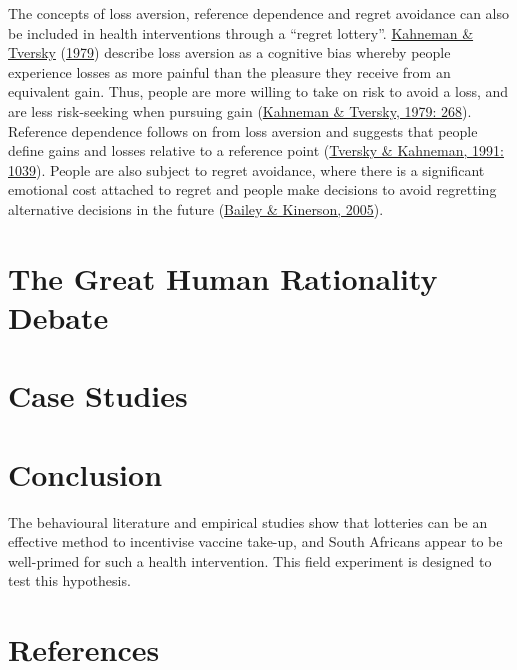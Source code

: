 \documentclass[11pt,preprint, authoryear]{elsarticle}
\numberwithin{equation}{section}
\numberwithin{figure}{section}
\numberwithin{table}{section}
\begin{document}
The concepts of loss aversion, reference dependence and regret avoidance
can also be included in health interventions through a ``regret
lottery''. \protect\hyperlink{ref-prospect}{Kahneman \& Tversky}
(\protect\hyperlink{ref-prospect}{1979}) describe loss aversion as a
cognitive bias whereby people experience losses as more painful than the
pleasure they receive from an equivalent gain. Thus, people are more
willing to take on risk to avoid a loss, and are less risk-seeking when
pursuing gain (\protect\hyperlink{ref-prospect}{Kahneman \& Tversky,
1979: 268}). Reference dependence follows on from loss aversion and
suggests that people define gains and losses relative to a reference
point (\protect\hyperlink{ref-ref}{Tversky \& Kahneman, 1991: 1039}).
People are also subject to regret avoidance, where there is a
significant emotional cost attached to regret and people make decisions
to avoid regretting alternative decisions in the future
(\protect\hyperlink{ref-regret}{Bailey \& Kinerson, 2005}).

\hypertarget{the-great-human-rationality-debate}{%
\section{\texorpdfstring{The Great Human Rationality Debate
\label{rev}}{The Great Human Rationality Debate }}\label{the-great-human-rationality-debate}}

\hypertarget{case-studies}{%
\section{\texorpdfstring{Case Studies
\label{case}}{Case Studies }}\label{case-studies}}

\hypertarget{conclusion}{%
\section{\texorpdfstring{Conclusion
\label{con}}{Conclusion }}\label{conclusion}}

The behavioural literature and empirical studies show that lotteries can
be an effective method to incentivise vaccine take-up, and South
Africans appear to be well-primed for such a health intervention. This
field experiment is designed to test this hypothesis.

\newpage

\hypertarget{references}{%
\section*{References}\label{references}}
\end{document}
